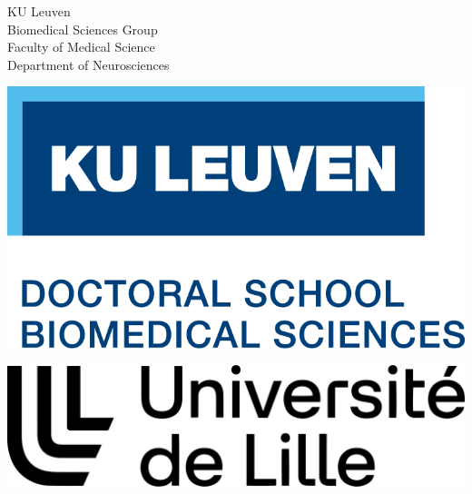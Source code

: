 \begin{titlepage}

    \sffamily
    \begin{minipage}[t]{.3\textwidth}
    \vspace{0pt}
    KU Leuven \\
    Biomedical Sciences Group \\
    Faculty of Medical Science \\
    Department of Neurosciences

    \end{minipage}\hfill%
    \begin{minipage}[t]{.3\textwidth}
      \vspace{0pt}
      \includegraphics[width=\textwidth]{figures/kul_docschool.png}
      \bigskip

      \includegraphics[width=\textwidth]{figures/ulille.png}
    \end{minipage}

    \vfill

    \noindent{}
\end{titlepage}
